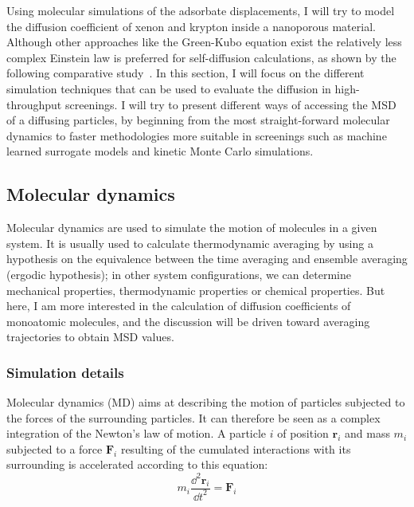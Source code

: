 \documentclass[main]{subfiles}
\begin{document}
Using molecular simulations of the adsorbate displacements, I will try to model the diffusion coefficient of xenon and krypton inside a nanoporous material. Although other approaches like the Green-Kubo equation exist the relatively less complex Einstein law is preferred for self-diffusion calculations, as shown by the following comparative study~\cite{Maginn_2020}. In this section, I will focus on the different simulation techniques that can be used to evaluate the diffusion in high-throughput screenings. I will try to present different ways of accessing the MSD of a diffusing particles, by beginning from the most straight-forward molecular dynamics to faster methodologies more suitable in screenings such as machine learned surrogate models and kinetic Monte Carlo simulations.


\subsection{Molecular dynamics}

Molecular dynamics are used to simulate the motion of molecules in a given system. It is usually used to calculate thermodynamic averaging by using a hypothesis on the equivalence between the time averaging and ensemble averaging (ergodic hypothesis); in other system configurations, we can determine mechanical properties, thermodynamic properties or chemical properties. But here, I am more interested in the calculation of diffusion coefficients of monoatomic molecules, and the discussion will be driven toward averaging trajectories to obtain MSD values.

\subsubsection{Simulation details}

Molecular dynamics (MD) aims at describing the motion of particles subjected to the forces of the surrounding particles. It can therefore be seen as a complex integration of the Newton's law of motion. A particle $i$ of position $\mathbf{r}_i$ and mass $m_i$ subjected to a force $\mathbf{F}_i$ resulting of the cumulated interactions with its surrounding is accelerated according to this equation:
\begin{equation}\label{eq:newton}
  m_i\frac{\dd^2 \mathbf{r}_i}{{\dd t}^2} = \mathbf{F}_i
\end{equation}
\end{document}
